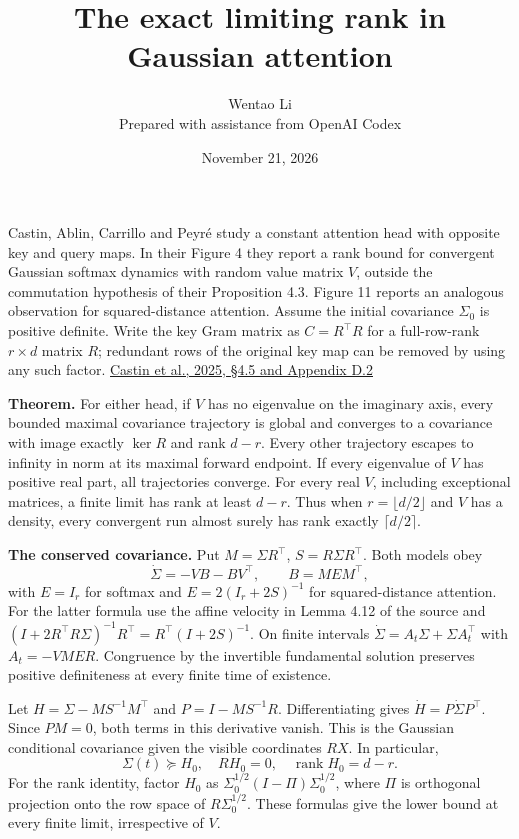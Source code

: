 \documentclass[11pt]{article}
\author{Wentao Li\\\small Prepared with assistance from OpenAI Codex}
\date{November 21, 2026}
\title{The exact limiting rank in Gaussian attention}
\begin{document}
\maketitle
Castin, Ablin, Carrillo and Peyré study a constant attention head with opposite key and query maps. In their Figure 4 they report a rank bound for convergent Gaussian softmax dynamics with random value matrix \(V\), outside the commutation hypothesis of their Proposition 4.3. Figure 11 reports an analogous observation for squared-distance attention. Assume the initial covariance \(\Sigma_0\) is positive definite. Write the key Gram matrix as \(C=R^\top R\) for a full-row-rank \(r\times d\) matrix \(R\); redundant rows of the original key map can be removed by using any such factor. \href{https://arxiv.org/abs/2501.18322}{Castin et al., 2025, §4.5 and Appendix D.2}

\textbf{Theorem.} For either head, if \(V\) has no eigenvalue on the imaginary axis, every bounded maximal covariance trajectory is global and converges to a covariance with image exactly \(\ker R\) and rank \(d-r\). Every other trajectory escapes to infinity in norm at its maximal forward endpoint. If every eigenvalue of \(V\) has positive real part, all trajectories converge. For every real \(V\), including exceptional matrices, a finite limit has rank at least \(d-r\). Thus when \(r=\lfloor d/2\rfloor\) and \(V\) has a density, every convergent run almost surely has rank exactly \(\lceil d/2\rceil\).

\textbf{The conserved covariance.} Put \(M=\Sigma R^\top\), \(S=R\Sigma R^\top\). Both models obey \[
 \dot\Sigma=-VB-BV^\top,\qquad B=M E M^\top,
\] with \(E=I_r\) for softmax and \(E=2(I_r+2S)^{-1}\) for squared-distance attention. For the latter formula use the affine velocity in Lemma 4.12 of the source and \((I+2R^\top R\Sigma)^{-1}R^\top=R^\top(I+2S)^{-1}\). On finite intervals \(\dot\Sigma=A_t\Sigma+\Sigma A_t^\top\) with \(A_t=-VME R\). Congruence by the invertible fundamental solution preserves positive definiteness at every finite time of existence.

Let \(H=\Sigma-MS^{-1}M^\top\) and \(P=I-MS^{-1}R\). Differentiating gives \(\dot H=P\dot\Sigma P^\top\). Since \(PM=0\), both terms in this derivative vanish. This is the Gaussian conditional covariance given the visible coordinates \(RX\). In particular, \[
 \Sigma(t)\succeq H_0,\quad RH_0=0,\quad \operatorname{rank}H_0=d-r .
\] For the rank identity, factor \(H_0\) as \(\Sigma_0^{1/2}(I-\Pi)\Sigma_0^{1/2}\), where \(\Pi\) is orthogonal projection onto the row space of \(R\Sigma_0^{1/2}\). These formulas give the lower bound at every finite limit, irrespective of \(V\).
\end{document}
